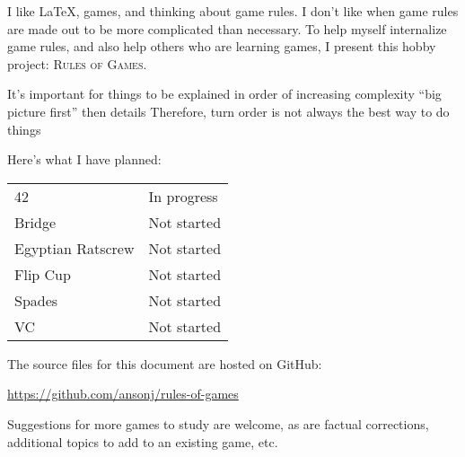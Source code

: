 
I like \LaTeX, games, and thinking about game rules. I don't like when game rules are made out to be more complicated than necessary. To help myself internalize game rules, and also help others who are learning games, I present this hobby project: \textsc{Rules of Games}.

It's important for things to be explained in order of increasing complexity
``big picture first''
then details
Therefore, turn order is not always the best way to do things

Here's what I have planned:

\begin{center}

\begin{tabular}{l|l}
    42 & In progress \\
    Bridge & Not started \\
    Egyptian Ratscrew & Not started \\
    Flip Cup & Not started \\
    Spades & Not started \\
    VC & Not started \\
\end{tabular}

\end{center}

The source files for this document are hosted on GitHub:

\begin{center}
    \url{https://github.com/ansonj/rules-of-games}
\end{center}

Suggestions for more games to study are welcome, as are factual corrections, additional topics to add to an existing game, etc.
